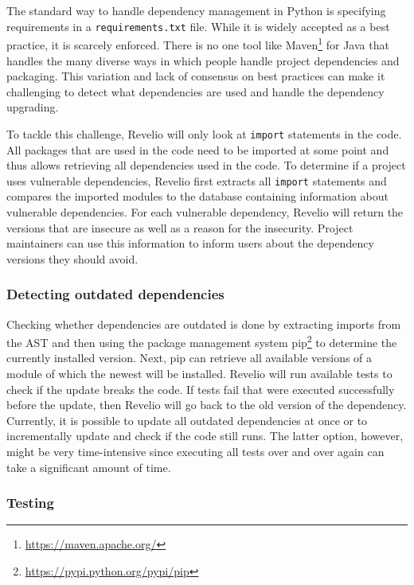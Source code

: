 The standard way to handle dependency management in Python is specifying requirements in a \texttt{requirements.txt} file. While it is widely accepted as a best practice, it is scarcely enforced. There is no one tool like Maven\footnote{\url{https://maven.apache.org/}} for Java that handles the many diverse ways in which people handle project dependencies and packaging. This variation and lack of consensus on best practices can make it challenging to detect what dependencies are used and handle the dependency upgrading. 

To tackle this challenge, Revelio will only look at \texttt{import} statements in the code. All packages that are used in the code need to be imported at some point and thus allows retrieving all dependencies used in the code.
To determine if a project uses vulnerable dependencies, Revelio first extracts all \texttt{import} statements and compares the imported modules to the database containing information about vulnerable dependencies. For each vulnerable dependency, Revelio will return the versions that are insecure as well as a reason for the insecurity. Project maintainers can use this information to inform users about the dependency versions they should avoid.

\subsubsection{Detecting outdated dependencies}

Checking whether dependencies are outdated is done by extracting imports from the AST and then using the package management system pip\footnote{\url{https://pypi.python.org/pypi/pip}} to determine the currently installed version. Next, pip can retrieve all available versions of a module of which the newest will be installed. Revelio will run available tests to check if the update breaks the code. If tests fail that were executed successfully before the update, then Revelio will go back to the old version of the dependency. Currently, it is possible to update all outdated dependencies at once or to incrementally update and check if the code still runs. The latter option, however, might be very time-intensive since executing all tests over and over again can take a significant amount of time.


\subsubsection{Testing}\label{sec:testing}

